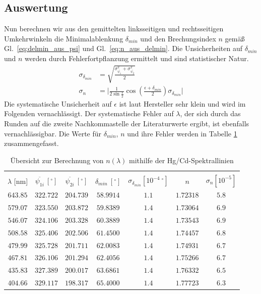 \documentclass[12pt,a4paper]{article}
\begin{document}
\subsection{Auswertung}
Nun berechnen wir aus den gemittelten linksseitigen und rechtsseitigen Umkehrwinkeln die Minimalablenkung $\delta_{min}$ und den Brechungsindex $n$ gemäß Gl.~\eqref{eq:delmin_aus_psi} und Gl.~\eqref{eq:n_aus_delmin}. Die Unsicherheiten auf $\delta_{min}$ und $n$ werden durch Fehlerfortpflanzung ermittelt und sind statistischer Natur.
\begin{align}
\sigma_{\delta_{min}}&=\sqrt{\frac{\sigma_{\overline{\psi_1}}^2+\sigma_{\overline{\psi_2}}^2}{2}}\\
\sigma_n&=\Big|\frac{1}{2\sin{\frac{\epsilon}{2}}}\cos{\left(\frac{\epsilon+\delta_{min}}{2}\right)}\sigma_{\delta_{min}}\Big|
\end{align}
Die systematische Unsicherheit auf $\epsilon$ ist laut Hersteller sehr klein und wird im Folgenden vernachlässigt. Der systematische Fehler auf $\lambda$, der sich durch das Runden auf die zweite Nachkommastelle der Literaturwerte ergibt, ist ebenfalls vernachlässigbar. Die Werte für  $\delta_{min}$, $n$ und ihre Fehler werden in Tabelle \ref{table:CdHg_Rechnung} zusammengefasst.\\
\begin{table}[H]
	\centering
	\begin{tabular}{|c|c|c|c|c|c|c|}
		\hline
		&&&&&&\\
		$\lambda$ [nm]&$\overline{\psi_{1i}}\ [^{\circ}]$&$\overline{\psi_{2i}}\ [^{\circ}]$&$\delta_{min}\ [^{\circ}]$&$\sigma_{\delta_{min}}[10^{-4}\ ^{\circ}]$& $n$ & $\sigma_{n}[10^{-5}]$\\
		\hline
		$643.85$&$322.722$&$204.739$&$58.9914$&$1.1$&$1.72318$&$5.8$\\
		$579.07$&$323.550$&$203.872$&$59.8389$&$1.4$&$1.73064$&$6.9$\\
		$546.07$&$324.106$&$203.328$&$60.3889$&$1.4$&$1.73543$&$6.9$\\
		$508.58$&$325.406$&$202.506$&$61.4500$&$1.4$&$1.74457$&$6.8$\\
		$479.99$&$325.728$&$201.711$&$62.0083$&$1.4$&$1.74931$&$6.7$\\
		$467.81$&$326.106$&$201.294$&$62.4056$&$1.4$&$1.75266$&$6.7$\\
		$435.83$&$327.389$&$200.017$&$63.6861$&$1.4$&$1.76332$&$6.5$\\
		$404.66$&$329.117$&$198.317$&$65.4000$&$1.4$&$1.77723$&$6.3$\\
		\hline
	\end{tabular}
	\caption{Übersicht zur Berechnung von $n(\lambda)$ mithilfe der Hg/Cd-Spektrallinien}
	\label{table:CdHg_Rechnung}
\end{table}
\end{document}
